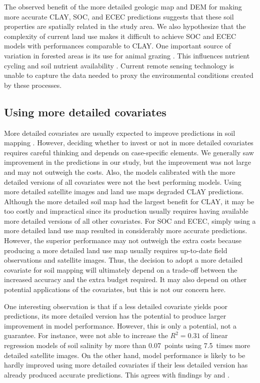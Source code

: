 The observed benefit of the more detailed geologic map and DEM for making more accurate CLAY, SOC, and ECEC 
predictions suggests that these soil properties are spatially related in the study area. We also hypothesize 
that the complexity of current land use makes it difficult to achieve SOC and ECEC models with performances 
comparable to CLAY. One important source of variation in forested areas is its use for animal grazing 
\cite{SamuelRosaEtAl2011a}. This influences nutrient cycling and soil nutrient availability 
\cite{SchramaEtAl2013}. Current remote sensing technology is unable to capture the data needed to proxy the 
environmental conditions created by these processes.

\subsection{Using more detailed covariates}

More detailed covariates are usually expected to improve predictions in soil mapping \cite{CavazziEtAl2013, 
MaynardEtAl2014}. However, deciding whether to invest or not in more detailed covariates requires careful 
thinking and depends on case-specific elements. We generally saw improvement in the predictions in our study, 
but the improvement was not large and may not outweigh the costs. Also, the models calibrated with the more 
detailed versions of all covariates were not the best performing models. Using more detailed satellite images 
and land use maps degraded CLAY predictions. Although the more detailed soil map had the largest benefit for 
CLAY, it may be too costly and impractical since its production usually requires having available more detailed 
versions of all other covariates. For SOC and ECEC, simply using a more detailed land use map resulted in 
considerably more accurate predictions. However, the superior performance may not outweigh the extra costs 
because producing a more detailed land use map usually requires up-to-date field observations and satellite 
images. Thus, the decision to adopt a more detailed covariate for soil mapping will ultimately depend on a 
trade-off between the increased accuracy and the extra budget required. It may also depend on other potential 
applications of the covariates, but this is not our concern here.

One interesting observation is that if a less detailed covariate yields poor predictions, its more detailed 
version has the potential to produce larger improvement in model performance. However, this is only a 
potential, not a guarantee. For instance,  were not able to increase the $R^2 = 
0.31$ of linear regression models of soil salinity by more than \num{0.07}~points using \num{7.5}~times more 
detailed satellite images. On the other hand, model performance is likely to be hardly improved using more 
detailed covariates if their less detailed version has already produced accurate predictions. This agrees with 
findings by  and .

